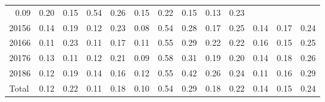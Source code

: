 \begin{table}[!h]
\begin{tabular}{lllllllllllll}
  \multicolumn{1}{r}{0.09} &
  \multicolumn{1}{r}{0.20} &
  \multicolumn{1}{r}{0.15} &
  \multicolumn{1}{r}{0.54} &
  \multicolumn{1}{r}{0.26} &
  \multicolumn{1}{r}{0.15} &
  \multicolumn{1}{r}{0.22} &
  \multicolumn{1}{r}{0.15} &
  \multicolumn{1}{r}{0.13} &
  \multicolumn{1}{r}{0.23} \\
\multicolumn{1}{l}{\hspace{1em}20156} &
  \multicolumn{1}{|r}{0.14} &
  \multicolumn{1}{r}{0.19} &
  \multicolumn{1}{r}{0.12} &
  \multicolumn{1}{r}{0.23} &
  \multicolumn{1}{r}{0.08} &
  \multicolumn{1}{r}{0.54} &
  \multicolumn{1}{r}{0.28} &
  \multicolumn{1}{r}{0.17} &
  \multicolumn{1}{r}{0.25} &
  \multicolumn{1}{r}{0.14} &
  \multicolumn{1}{r}{0.17} &
  \multicolumn{1}{r}{0.24} \\
\multicolumn{1}{l}{\hspace{1em}20166} &
  \multicolumn{1}{|r}{0.11} &
  \multicolumn{1}{r}{0.23} &
  \multicolumn{1}{r}{0.11} &
  \multicolumn{1}{r}{0.17} &
  \multicolumn{1}{r}{0.11} &
  \multicolumn{1}{r}{0.55} &
  \multicolumn{1}{r}{0.29} &
  \multicolumn{1}{r}{0.22} &
  \multicolumn{1}{r}{0.22} &
  \multicolumn{1}{r}{0.16} &
  \multicolumn{1}{r}{0.15} &
  \multicolumn{1}{r}{0.25} \\
\multicolumn{1}{l}{\hspace{1em}20176} &
  \multicolumn{1}{|r}{0.13} &
  \multicolumn{1}{r}{0.11} &
  \multicolumn{1}{r}{0.12} &
  \multicolumn{1}{r}{0.21} &
  \multicolumn{1}{r}{0.09} &
  \multicolumn{1}{r}{0.58} &
  \multicolumn{1}{r}{0.31} &
  \multicolumn{1}{r}{0.19} &
  \multicolumn{1}{r}{0.20} &
  \multicolumn{1}{r}{0.14} &
  \multicolumn{1}{r}{0.18} &
  \multicolumn{1}{r}{0.26} \\
\multicolumn{1}{l}{\hspace{1em}20186} &
  \multicolumn{1}{|r}{0.12} &
  \multicolumn{1}{r}{0.19} &
  \multicolumn{1}{r}{0.14} &
  \multicolumn{1}{r}{0.16} &
  \multicolumn{1}{r}{0.12} &
  \multicolumn{1}{r}{0.55} &
  \multicolumn{1}{r}{0.42} &
  \multicolumn{1}{r}{0.26} &
  \multicolumn{1}{r}{0.24} &
  \multicolumn{1}{r}{0.11} &
  \multicolumn{1}{r}{0.16} &
  \multicolumn{1}{r}{0.29} \\
\multicolumn{1}{l}{\hspace{1em}Total} &
  \multicolumn{1}{|r}{0.12} &
  \multicolumn{1}{r}{0.22} &
  \multicolumn{1}{r}{0.11} &
  \multicolumn{1}{r}{0.18} &
  \multicolumn{1}{r}{0.10} &
  \multicolumn{1}{r}{0.54} &
  \multicolumn{1}{r}{0.29} &
  \multicolumn{1}{r}{0.18} &
  \multicolumn{1}{r}{0.22} &
  \multicolumn{1}{r}{0.14} &
  \multicolumn{1}{r}{0.15} &
  \multicolumn{1}{r}{0.24} \\
\cline{1-13}
\end{tabular}
\end{table}
